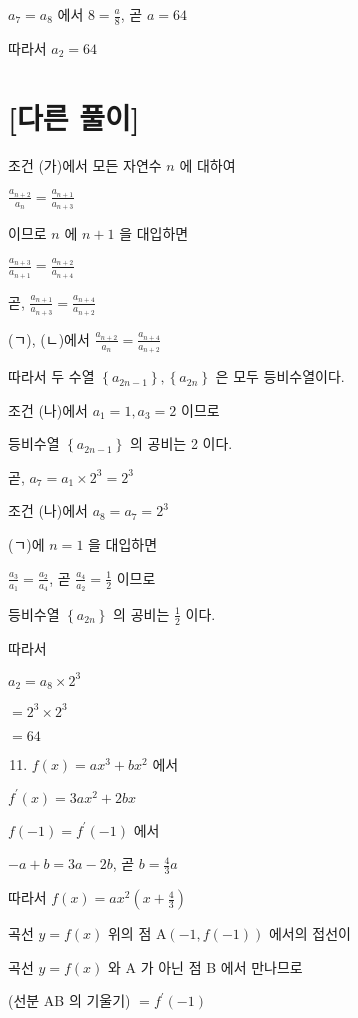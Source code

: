 \documentclass[10pt]{article}
\begin{document}
$a_{7}=a_{8}$ 에서 $8=\frac{a}{8}$, 곧 $a=64$

따라서 $a_{2}=64$

\section*{[다른 풀이]}
조건 (가)에서 모든 자연수 $n$ 에 대하여

$\frac{a_{n+2}}{a_{n}}=\frac{a_{n+1}}{a_{n+3}}$

이므로 $n$ 에 $n+1$ 을 대입하면

$\frac{a_{n+3}}{a_{n+1}}=\frac{a_{n+2}}{a_{n+4}}$

곧, $\frac{a_{n+1}}{a_{n+3}}=\frac{a_{n+4}}{a_{n+2}}$

(ㄱ), (ㄴ)에서 $\frac{a_{n+2}}{a_{n}}=\frac{a_{n+4}}{a_{n+2}}$

따라서 두 수열 $\left\{a_{2 n-1}\right\},\left\{a_{2 n}\right\}$ 은 모두 등비수열이다.

조건 (나)에서 $a_{1}=1, a_{3}=2$ 이므로

등비수열 $\left\{a_{2 n-1}\right\}$ 의 공비는 2 이다.

곧, $a_{7}=a_{1} \times 2^{3}=2^{3}$

조건 (나)에서 $a_{8}=a_{7}=2^{3}$

(ㄱ)에 $n=1$ 을 대입하면

$\frac{a_{3}}{a_{1}}=\frac{a_{2}}{a_{4}}$, 곧 $\frac{a_{4}}{a_{2}}=\frac{1}{2}$ 이므로

등비수열 $\left\{a_{2 n}\right\}$ 의 공비는 $\frac{1}{2}$ 이다.

따라서

$a_{2}=a_{8} \times 2^{3}$

$=2^{3} \times 2^{3}$

$=64$

\begin{enumerate}
  \setcounter{enumi}{10}
  \item $f(x)=a x^{3}+b x^{2}$ 에서
\end{enumerate}

$f^{\prime}(x)=3 a x^{2}+2 b x$

$f(-1)=f^{\prime}(-1)$ 에서

$-a+b=3 a-2 b$, 곧 $b=\frac{4}{3} a$

따라서 $f(x)=a x^{2}\left(x+\frac{4}{3}\right)$

곡선 $y=f(x)$ 위의 점 $\mathrm{A}(-1, f(-1))$ 에서의 접선이

곡선 $y=f(x)$ 와 A 가 아닌 점 B 에서 만나므로

(선분 AB 의 기울기) $=f^{\prime}(-1)$
\end{document}
